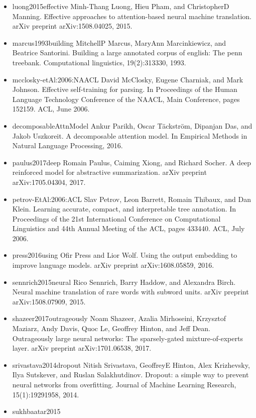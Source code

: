 \documentclass[11pt,a4paper]{article}
\begin{document}
\begin{itemize}
Multi-task sequence to sequence learning.
arXiv preprint arXiv:1511.06114, 2015.
\item luong2015effective
Minh-Thang Luong, Hieu Pham, and ChristopherD Manning.
Effective approaches to attention-based neural machine translation.
arXiv preprint arXiv:1508.04025, 2015.
\item marcus1993building
MitchellP Marcus, MaryAnn Marcinkiewicz, and Beatrice Santorini.
Building a large annotated corpus of english: The penn treebank.
Computational linguistics, 19(2):313330, 1993.
\item mcclosky-etAl:2006:NAACL
David McClosky, Eugene Charniak, and Mark Johnson.
Effective self-training for parsing.
In Proceedings of the Human Language Technology Conference of
 the NAACL, Main Conference, pages 152159. ACL, June 2006.
\item decomposableAttnModel
Ankur Parikh, Oscar Täckström, Dipanjan Das, and Jakob Uszkoreit.
A decomposable attention model.
In Empirical Methods in Natural Language Processing, 2016.
\item paulus2017deep
Romain Paulus, Caiming Xiong, and Richard Socher.
A deep reinforced model for abstractive summarization.
arXiv preprint arXiv:1705.04304, 2017.
\item petrov-EtAl:2006:ACL
Slav Petrov, Leon Barrett, Romain Thibaux, and Dan Klein.
Learning accurate, compact, and interpretable tree annotation.
In Proceedings of the 21st International Conference on
 Computational Linguistics and 44th Annual Meeting of the ACL, pages
  433440. ACL, July 2006.
\item press2016using
Ofir Press and Lior Wolf.
Using the output embedding to improve language models.
arXiv preprint arXiv:1608.05859, 2016.
\item sennrich2015neural
Rico Sennrich, Barry Haddow, and Alexandra Birch.
Neural machine translation of rare words with subword units.
arXiv preprint arXiv:1508.07909, 2015.
\item shazeer2017outrageously
Noam Shazeer, Azalia Mirhoseini, Krzysztof Maziarz, Andy Davis, Quoc Le,
  Geoffrey Hinton, and Jeff Dean.
Outrageously large neural networks: The sparsely-gated
  mixture-of-experts layer.
arXiv preprint arXiv:1701.06538, 2017.
\item srivastava2014dropout
Nitish Srivastava, GeoffreyE Hinton, Alex Krizhevsky, Ilya Sutskever, and
  Ruslan Salakhutdinov.
Dropout: a simple way to prevent neural networks from overfitting.
Journal of Machine Learning Research, 15(1):19291958, 2014.
\item sukhbaatar2015

\end{itemize}
\end{document}
